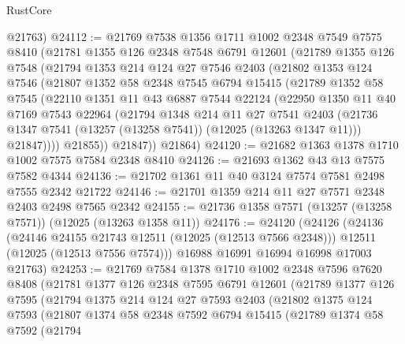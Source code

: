 \begin{lexlean}{RustCore}
\begin{coremodule}
      @21763)
@24112 := @21769
    @7538
    @1356
    @1711
    @1002
    @2348
    @7549
    @7575
    @8410
    (@21781
      @1355
      @126
      @2348
      @7548
      @6791
      @12601
      (@21789
        @1355
        @126
        @7548
        (@21794
          @1353
          @214
          @124
          @27
          @7546
          @2403
          (@21802
            @1353
            @124
            @7546
            (@21807
              @1352
              @58
              @2348
              @7545
              @6794
              @15415
              (@21789
                @1352
                @58
                @7545
                (@22110
                  @1351
                  @11
                  @43
                  @6887
                  @7544
                  @22124
                  (@22950
                    @1350
                    @11
                    @40
                    @7169
                    @7543
                    @22964
                    (@21794
                      @1348
                      @214
                      @11
                      @27
                      @7541
                      @2403
                      (@21736 @1347 @7541 (@13257 (@13258 @7541)) (@12025 (@13263 @1347 @11)))
                      @21847))))
              @21855))
          @21847))
      @21864)
@24120 := @21682 @1363 @1378 @1710 @1002 @7575 @7584 @2348 @8410
@24126 := @21693 @1362 @43 @13 @7575 @7582 @4344
@24136 := @21702 @1361 @11 @40 @3124 @7574 @7581 @2498 @7555 @2342 @21722
@24146 := @21701 @1359 @214 @11 @27 @7571 @2348 @2403 @2498 @7565 @2342
@24155 := @21736 @1358 @7571 (@13257 (@13258 @7571)) (@12025 (@13263 @1358 @11))
@24176 := @24120
    (@24126
      (@24136
        (@24146 @24155 @21743 @12511 (@12025 (@12513 @7566 @2348)))
        @12511
        (@12025 (@12513 @7556 @7574)))
      @16988
      @16991
      @16994
      @16998
      @17003
      @21763)
@24253 := @21769
    @7584
    @1378
    @1710
    @1002
    @2348
    @7596
    @7620
    @8408
    (@21781
      @1377
      @126
      @2348
      @7595
      @6791
      @12601
      (@21789
        @1377
        @126
        @7595
        (@21794
          @1375
          @214
          @124
          @27
          @7593
          @2403
          (@21802
            @1375
            @124
            @7593
            (@21807
              @1374
              @58
              @2348
              @7592
              @6794
              @15415
              (@21789
                @1374
                @58
                @7592
                (@21794

\end{coremodule}
\end{lexlean}
